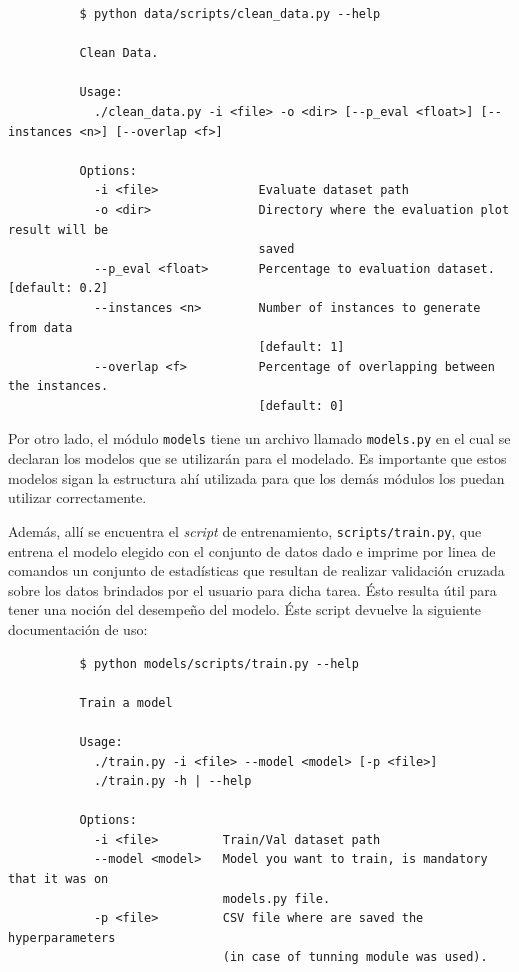           \begin{lstlisting}
          $ python data/scripts/clean_data.py --help

          Clean Data.

          Usage:
            ./clean_data.py -i <file> -o <dir> [--p_eval <float>] [--instances <n>] [--overlap <f>]

          Options:
            -i <file>              Evaluate dataset path
            -o <dir>               Directory where the evaluation plot result will be
                                   saved
            --p_eval <float>       Percentage to evaluation dataset. [default: 0.2]
            --instances <n>        Number of instances to generate from data
                                   [default: 1]
            --overlap <f>          Percentage of overlapping between the instances.
                                   [default: 0]

          \end{lstlisting}


        \par Por otro lado, el módulo \verb|models| tiene un archivo llamado
          \verb|models.py| en el cual se declaran los modelos
          que se utilizarán para el modelado. Es importante que estos modelos
          sigan la estructura ahí utilizada para que los demás módulos los
          puedan utilizar correctamente.

        \par Además, allí se encuentra el \textit{script} de entrenamiento,
          \verb|scripts/train.py|, que entrena el modelo elegido con el conjunto
          de datos dado e imprime por linea de comandos un conjunto de
          estadísticas que resultan de realizar validación cruzada sobre
          los datos brindados por el usuario para dicha tarea. Ésto resulta útil
          para tener una noción del desempeño del modelo.
          Éste script devuelve la siguiente documentación de uso:
          \begin{lstlisting}
          $ python models/scripts/train.py --help

          Train a model

          Usage:
            ./train.py -i <file> --model <model> [-p <file>]
            ./train.py -h | --help

          Options:
            -i <file>         Train/Val dataset path
            --model <model>   Model you want to train, is mandatory that it was on
                              models.py file.
            -p <file>         CSV file where are saved the hyperparameters
                              (in case of tunning module was used).
          \end{lstlisting}


